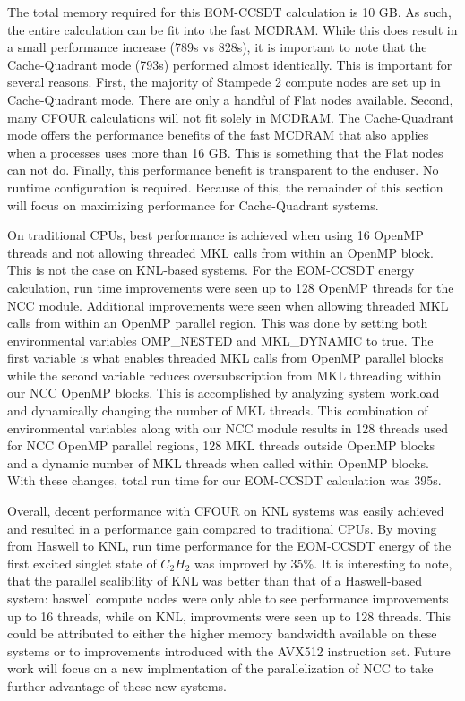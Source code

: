 The total memory required for this EOM-CCSDT calculation is 10 GB. As such, the entire calculation can
be fit into the fast MCDRAM. While this does result in a small performance increase (789s vs 828s), it is important
to note that the Cache-Quadrant mode (793s) performed almost identically. This is important for several reasons. First,
the majority of Stampede 2 compute nodes are set up in Cache-Quadrant mode. There are only a handful of Flat nodes
available. Second, many CFOUR calculations will not fit solely in MCDRAM. The Cache-Quadrant mode offers the 
performance benefits of the fast MCDRAM that also applies when a processes uses more than 16 GB. This is something
that the Flat nodes can not do. Finally, this performance benefit is transparent to the enduser. No runtime 
configuration is required. Because of this, the remainder of this section will focus on maximizing performance 
for Cache-Quadrant systems.

On traditional CPUs, best performance is achieved when using 16 OpenMP threads and not allowing threaded MKL calls
from within an OpenMP block. This is not the case on KNL-based systems. For the EOM-CCSDT energy calculation, 
run time improvements were seen up to 128 OpenMP threads for the NCC module. Additional improvements were seen
when allowing threaded MKL calls from within an OpenMP parallel region. This was done by setting both environmental
variables OMP\_NESTED and MKL\_DYNAMIC to true. The first variable is what enables threaded MKL calls from OpenMP
parallel blocks while the second variable reduces oversubscription from MKL threading within our NCC OpenMP blocks.
This is accomplished by analyzing system workload and dynamically changing the number of MKL threads. This 
combination of environmental variables along with our NCC module results in 128 threads used for NCC OpenMP parallel
regions, 128 MKL threads outside OpenMP blocks and a dynamic number of MKL threads when called within OpenMP blocks.
With these changes, total run time for our EOM-CCSDT calculation was 395s.

Overall, decent performance with CFOUR on KNL systems was easily achieved and resulted in a performance
gain compared to traditional CPUs. By moving from Haswell to KNL, run time performance for the EOM-CCSDT energy
of the first excited singlet state of $C_2H_2$ was improved by 35\%. It is interesting to note, that the 
parallel scalibility of KNL was better than that of a Haswell-based system: haswell compute nodes were only able 
to see performance improvements up to 16 threads, while on KNL, improvments were seen up to 128 threads. 
This could be attributed to either the higher memory bandwidth available on these systems or to improvements 
introduced with the AVX512 instruction set. Future work will focus on a new implmentation of the parallelization 
of NCC to take further advantage of these new systems.

